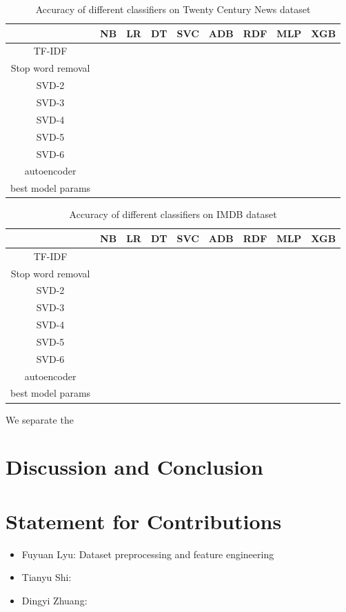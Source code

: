 \documentclass[11pt]{scrartcl}
\begin{document}
\begin{table}[H]
    \centering
    \begin{tabular}{c|cccccccc}
        \hline
         & NB   & LR & DT & SVC & ADB & RDF & MLP & XGB \\
        \hline
        TF-IDF & & & & & & & & \\
		Stop word removal & & & & & & & & \\
		SVD-2 & & & & & & & & \\
		SVD-3 & & & & & & & & \\
		SVD-4 & & & & & & & & \\
		SVD-5 & & & & & & & & \\
		SVD-6 & & & & & & & & \\
		autoencoder & & & & & & & & \\
		best model params & & & & & & & & \\
        \hline
    \end{tabular} 
    \caption{Accuracy of different classifiers on Twenty Century News dataset}
    \label{accuracy_20}
\end{table}

\begin{table}[H]
    \centering
    \begin{tabular}{c|cccccccc}
        \hline
         & NB   & LR & DT & SVC & ADB & RDF & MLP & XGB \\
        \hline
        TF-IDF & & & & & & & & \\
		Stop word removal & & & & & & & & \\
		SVD-2 & & & & & & & & \\
		SVD-3 & & & & & & & & \\
		SVD-4 & & & & & & & & \\
		SVD-5 & & & & & & & & \\
		SVD-6 & & & & & & & & \\
		autoencoder & & & & & & & & \\
		best model params & & & & & & & & \\
        \hline
    \end{tabular} 
    \caption{Accuracy of different classifiers on IMDB dataset}
    \label{accuracy_imdb}
\end{table}

We separate the 
\section{Discussion and Conclusion}

\section{Statement for Contributions}
\begin{itemize}
	\item Fuyuan Lyu: Dataset preprocessing and feature engineering
	\item Tianyu Shi:
	\item Dingyi Zhuang:
\end{itemize}



\end{document}
